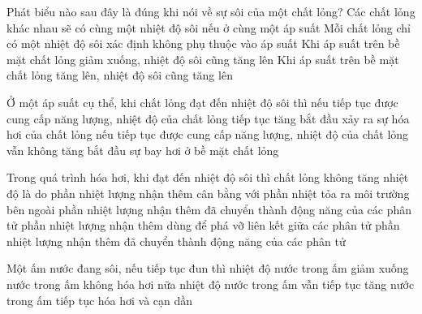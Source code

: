 \begin{ex} 
	Phát biểu nào sau đây là đúng khi nói về sự sôi của một chất lỏng?
	\choice
	{Các chất lỏng khác nhau sẽ có cùng một nhiệt độ sôi nếu ở cùng một áp suất}
	{Mỗi chất lỏng chỉ có một nhiệt độ sôi xác định không phụ thuộc vào áp suất}
	{Khi áp suất trên bề mặt chất lỏng giảm xuống, nhiệt độ sôi cũng tăng lên}
	{\True Khi áp suất trên bề mặt chất lỏng tăng lên, nhiệt độ sôi cũng tăng lên}
\end{ex}








\begin{ex} 
	Ở một áp suất cụ thể, khi chất lỏng đạt đến nhiệt độ sôi thì
	\choice
	{nếu tiếp tục được cung cấp năng lượng, nhiệt độ của chất lỏng tiếp tục tăng}
	{bắt đầu xảy ra sự hóa hơi của chất lỏng}
	{\True nếu tiếp tục được cung cấp năng lượng, nhiệt độ của chất lỏng vẫn không tăng}
	{bắt đầu sự bay hơi ở bề mặt chất lỏng}
\end{ex}

\begin{ex} 
	Trong quá trình hóa hơi, khi đạt đến nhiệt độ sôi thì chất lỏng không tăng nhiệt độ là do
	\choice
	{phần nhiệt lượng nhận thêm cân bằng với phần nhiệt tỏa ra môi trường bên ngoài}
	{phần nhiệt lượng nhận thêm đã chuyển thành động năng của các phân tử}
	{\True phần nhiệt lượng nhận thêm dùng để phá vỡ liên kết giữa các phân tử}
	{phần nhiệt lượng nhận thêm đã chuyển thành động năng của các phân tử}
\end{ex}





\begin{ex}
	Một ấm nước đang sôi, nếu tiếp tục đun thì
	\choice
	{nhiệt độ nước trong ấm giảm xuống}
	{nước trong ấm không hóa hơi nữa}
	{nhiệt độ nước trong ấm vẫn tiếp tục tăng}
	{\True nước trong ấm tiếp tục hóa hơi và cạn dần}
	\end{ex}

